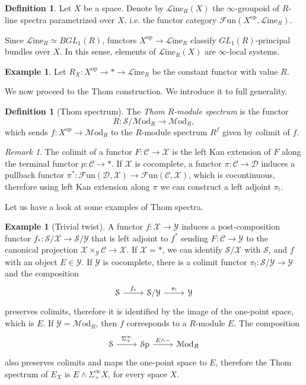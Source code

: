 \documentclass[a4paper]{book}
\newcommand{\lC}{\mathcal{C}}
\newcommand{\lD}{\mathcal{D}}
\newcommand{\lF}{\mathcal{F}}
\newcommand{\lL}{\mathcal{L}}
\newcommand{\lM}{\mathcal{M}}
\newcommand{\lS}{\mathcal{S}}
\newcommand{\lX}{\mathcal{X}}
\newcommand{\lY}{\mathcal{Y}}
\newcommand{\op}{\mathrm{op}}
\newcommand{\Fun}{\lF\mathrm{un}} %
\newcommand{\Sp}{\lS\mathrm{p}} %
\renewcommand{\Line}{\lL\mathrm{ine}} %
\newcommand{\Mod}{\lM\mathrm{od}} %
\theoremstyle{definition}
\newtheorem{definition}[equation]{Definition}
\newtheorem{example}[equation]{Example}
\theoremstyle{remark}
\newtheorem{remark}[equation]{Remark}
\numberwithin{equation}{section}
\begin{document}
\begin{definition}
	Let $X$ be a space. Denote by $\Line_R(X)$ the $\infty$-groupoid of $R$-line spectra parametrized over $X$, i.e. the functor category $\Fun(X^{\op},\Line_R)$. 
\end{definition}
Since $\Line_R\simeq BGL_1(R)$, functors $X^{\op}\to\Line_R$ classify $GL_1(R)$-principal bundles over $X$. In this sense, elements of $\Line_R(X)$ are $\infty$-local systems. 
\begin{example}
	Let $R_X\colon X^{\op} \to*\to \Line_R$ be the constant functor with value $R$. 
\end{example}
We now proceed to the Thom construction. We introduce it to full generality. 
\begin{definition}[{Thom spectrum}] \label{def:thom}
	The \emph{Thom $R$-module spectrum} is the functor
	\[
	R \colon \lS/\Mod_R \to \Mod_R,
	\]
	which sends $f\colon X^{\op} \to \Mod_R$ to the $R$-module spectrum $R^f$ given by colimit of $f$. 
\end{definition}
\begin{remark}The colimit of a functor $F:\lC\to\lX$ is the left Kan extension of $F$ along the terminal functor $p:\lC\to*$. If $\lX$ is cocomplete, a functor $\pi:\lC\to\lD$ induces a pullback functor $\pi^*:\Fun(\lD,\lX)\to\Fun(\lC,\lX)$, which is cocontinuous, therefore using left Kan extension along $\pi$ we can construct a left adjoint $\pi_!$.  
\end{remark}
Let us have a look at some examples of Thom spectra. 
\begin{example}[Trivial twist] A functor $f:\lX\to\lY$ induces a post-composition functor $f_*:\lS/\lX\to\lS/\lY$ that is left adjoint to $f^*$ sending $F:\lC\to\lY$ to the canonical projection $\lX\times_{\lY}\lC\to\lX$. If $\lX=*$, we can identify $\lS/\lX$ with $\lS$, and $f$ with an object $E\in\lY$. If $\lY$ is cocomplete, there is a colimit functor $\pi_!:\lS/\lY\to\lY$ and the composition \begin{equation}
	\begin{tikzcd}
		\lS \arrow[r,"f_*"] & \lS/\lY \arrow[r,"\pi_!"] & \lY
	\end{tikzcd}
\end{equation}preserves colimits, therefore it is identified by the image of the one-point space, which is $E$. If $\lY=\Mod_R$, then $f$ corresponds to a $R$-module $E$. The composition \begin{equation}
	\begin{tikzcd}
		\lS \arrow[r,"\Sigma^\infty_+"] & \Sp \arrow[r,"E\wedge-"] & \Mod_R
	\end{tikzcd}
\end{equation}also preserves colimits and maps the one-point space to $E$, therefore the Thom spectrum of $E_X$ is $E\wedge\Sigma^\infty_+X$, for every space $X$. 
\end{example}
\end{document}
